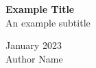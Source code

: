 \documentclass[a4paper,10pt]{report}
\begin{document}
\begin{titlepage}
    \centering
    \vspace*{3.5cm}
    \huge\textbf{Example Title}\\
    \large An example subtitle 

    \vfill

    January 2023\\
    \vspace{.25cm}
    \Large Author Name 
    \vspace{7.5cm}
\end{titlepage}

\tableofcontents

% 
\end{document}
